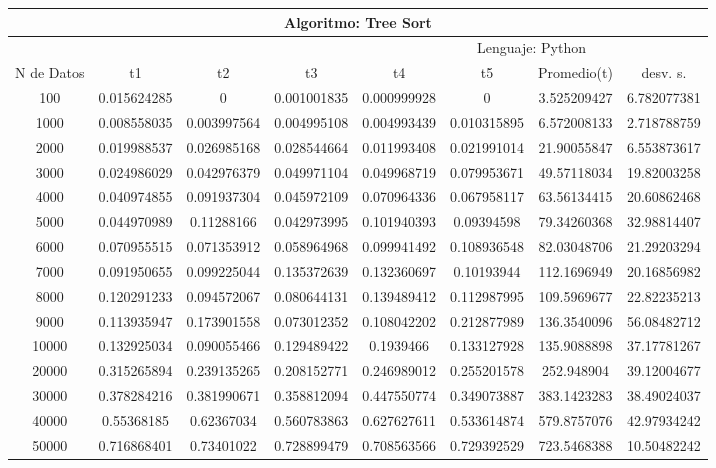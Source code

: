 \documentclass{article}
\begin{document}
	\begin{table}[]
        \begin{tabular}{|c|c|c|c|c|c|c|c| }
            \hline
            \multicolumn{8}{|c|}{Algoritmo: Tree Sort} \\ \hline
            \multicolumn{4}{|c|}{} & \multicolumn{4}{c|}{Lenguaje: Python} \\ \hline
              N de Datos &     t1    &  t2         &  t3          &   t4        &    t5     &   Promedio(t)       & desv. s. \\ \hline
100	    &0.015624285	&0	        &0.001001835	&0.000999928	&0	        &3.525209427	&6.782077381 \\ \hline
1000	&0.008558035	&0.003997564	&0.004995108	&0.004993439	&0.010315895	&6.572008133	&2.718788759\\ \hline
2000	&0.019988537	&0.026985168	&0.028544664	&0.011993408	&0.021991014	&21.90055847	&6.553873617\\ \hline
3000	&0.024986029	&0.042976379	&0.049971104	&0.049968719	&0.079953671	&49.57118034	&19.82003258\\ \hline
4000	&0.040974855	&0.091937304	&0.045972109	&0.070964336	&0.067958117	&63.56134415	&20.60862468\\ \hline
5000	&0.044970989	&0.11288166	&0.042973995	&0.101940393	&0.09394598	&79.34260368	&32.98814407\\ \hline
6000	&0.070955515	&0.071353912	&0.058964968	&0.099941492	&0.108936548	&82.03048706	&21.29203294\\ \hline
7000	&0.091950655	&0.099225044	&0.135372639	&0.132360697	&0.10193944	&112.1696949	&20.16856982\\ \hline
8000	&0.120291233	&0.094572067	&0.080644131	&0.139489412	&0.112987995	&109.5969677	&22.82235213\\ \hline
9000	&0.113935947	&0.173901558	&0.073012352	&0.108042202	&0.212877989	&136.3540096	&56.08482712\\ \hline
10000	&0.132925034	&0.090055466	&0.129489422	&0.1939466	&0.133127928	&135.9088898	&37.17781267\\ \hline
20000	&0.315265894	&0.239135265	&0.208152771	&0.246989012	&0.255201578	&252.948904	&39.12004677\\ \hline
30000	&0.378284216	&0.381990671	&0.358812094	&0.447550774	&0.349073887	&383.1423283	&38.49024037\\ \hline
40000	&0.55368185	&0.62367034	&0.560783863	&0.627627611	&0.533614874	&579.8757076	&42.97934242\\ \hline
50000	&0.716868401	&0.73401022	&0.728899479	&0.708563566	&0.729392529	&723.5468388	&10.50482242\\ \hline

\end{tabular}
\end{table}
\end{document}
